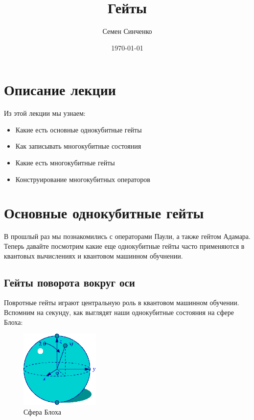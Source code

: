 \documentclass[11pt]{article}
\author{Семен Синченко}
\date{\today}
\title{Гейты}
\begin{document}
\maketitle
\tableofcontents


\section{Описание лекции}
\label{sec:org05f72b6}
Из этой лекции мы узнаем:
\begin{itemize}
\item Какие есть основные однокубитные гейты
\item Как записывать многокубитные состояния
\item Какие есть многокубитные гейты
\item Конструирование многокубитных операторов
\end{itemize}

\section{Основные однокубитные гейты}
\label{sec:orgfffb5e1}
В прошлый раз мы познакомились с операторами Паули, а также гейтом Адамара. Теперь давайте посмотрим какие еще однокубитные гейты часто применяются в квантовых вычислениях и квантовом машинном обучнении.

\subsection{Гейты поворота вокруг оси}
\label{sec:orgfcbf212}
Повротные гейты играют центральную роль в квантовом машинном обучении. Вспомним на секунду, как выглядят наши однокубитные состояния на сфере Блоха:

\begin{center}
\begin{figure}[htbp]
\centering
\includegraphics[width=0.35\textwidth]{./images/Blochcolor-alt.png}
\caption{Сфера Блоха}
\end{figure}
\end{center}
\end{document}
